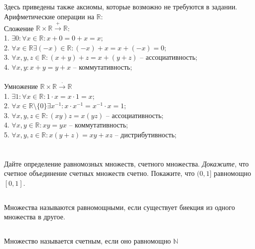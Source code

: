 \subsection{}
	Здесь приведены также аксиомы, которые возможно не требуются в задании.
	Арифметические операции на $\mathbb{R}$:\\
	Сложение $\mathbb{R}\times\mathbb{R}\xrightarrow{+}\mathbb{R}$:\\
	1. $\exists 0: \forall x\in\mathbb{R}:x+0=0+x=x;$\\
	2. $\forall x\in\mathbb{R} \exists (-x)\in\mathbb{R}:(-x)+x=x+(-x)=0;$\\
	3. $\forall x, y, z\in \mathbb{R}: (x + y) + z = x + (y + z)$ -- ассоциативность;\\
	4. $\forall x, y: x + y = y + x$ -- коммутативность;\\\\
	Умножение $\mathbb{R}\times\mathbb{R}\xrightarrow{\cdot}\mathbb{R}$\\
	1. $\exists 1: \forall x\in\mathbb{R}: 1\cdot x=x\cdot 1 = x;$\\
	2. $\forall x\in\mathbb{R}\setminus\{0\}\exists x^{-1}: x\cdot x^{-1} = x^{-1}\cdot x = 1;$\\
	3. $\forall x, y, z\in\mathbb{R}:(xy)z=x(yz)$ -- ассоциативность;\\
	4. $\forall x, y\in\mathbb{R}: xy=yx$ -- коммутативность;\\
	5. $\forall x, y, z\in\mathbb{R}: x(y+z) = xy+xz$ -- дистрибутивность;\\
\section{}
Дайте определение равномозных множеств, счетного множества. \textit{Докажите}, что счетное объединение счетных множеств счетно. Покажите, что $(0,1] $ равномощно $ [0, 1]$.
\subsection{}
Множества называются равномощными, если существует биекция из одного множества в другое.
\subsection{}
Множество называется счетным, если оно равномощно $\mathbb{N}$
